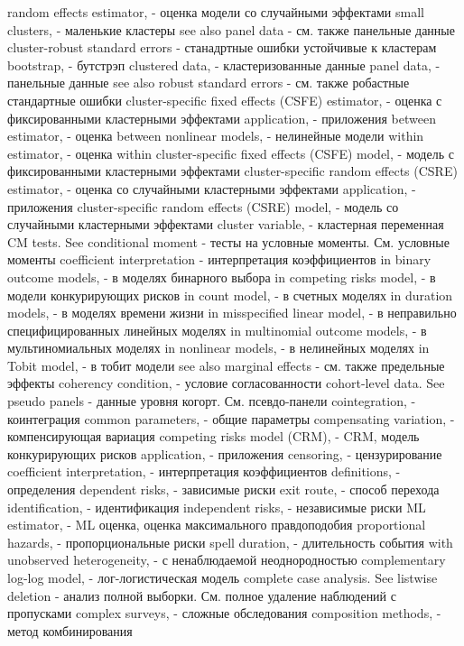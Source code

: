 random effects estimator, - оценка модели со случайными эффектами
small clusters, - маленькие кластеры
see also panel data - см. также панельные данные
cluster-robust standard errors - станадртные ошибки устойчивые к кластерам
bootstrap, - бутстрэп
clustered data, - кластеризованные данные
panel data, - панельные данные
see also robust standard errors - см. также робастные стандартные ошибки
cluster-specific fixed effects (CSFE) estimator, - оценка с фиксированными кластерными эффектами
application, - приложения
between estimator, - оценка between
nonlinear models, - нелинейные модели
within estimator, - оценка within
cluster-specific fixed effects (CSFE) model, - модель с фиксированными кластерными эффектами
cluster-specific random effects (CSRE) estimator, - оценка со случайными кластерными эффектами
application, - приложения
cluster-specific random effects (CSRE) model, - модель со случайными кластерными эффектами
cluster variable, - кластерная переменная
CM tests. See conditional moment - тесты на условные моменты. См. условные моменты
coefficient interpretation - интерпретация коэффициентов
in binary outcome models, - в моделях бинарного выбора 
in competing risks model, - в модели конкурирующих рисков
in count model, - в счетных моделях
in duration models, - в моделях времени жизни
in misspecified linear model, - в неправильно специфицированных линейных моделях
in multinomial outcome models, - в мультиномиальных моделях
in nonlinear models, - в нелинейных моделях
in Tobit model, - в тобит модели
see also marginal effects - см. также предельные эффекты
coherency condition, - условие согласованности
cohort-level data. See pseudo panels - данные уровня когорт. См. псевдо-панели
cointegration, - коинтеграция
common parameters, - общие параметры
compensating variation, - компенсирующая вариация
competing risks model (CRM), - CRM, модель конкурирующих рисков
application, - приложения 
censoring, - цензурирование
coefficient interpretation, - интерпретация коэффициентов
definitions, - определения
dependent risks, - зависимые риски
exit route, - способ перехода
identification, - идентификация
independent risks, - независимые риски
ML estimator, - ML оценка, оценка максимального правдоподобия
proportional hazards, - пропорциональные риски
spell duration, - длительность события
with unobserved heterogeneity,  - с ненаблюдаемой неоднородностью
complementary log-log model, - лог-логистическая модель
complete case analysis. See listwise deletion - анализ полной выборки. См. полное удаление наблюдений с пропусками
complex surveys, - сложные обследования
composition methods, - метод комбинирования
